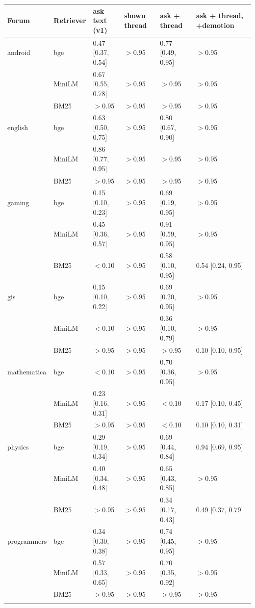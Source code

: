 \begin{tabular}{llllll}\toprule Forum & Retriever & ask text (v1) & shown thread & ask + thread & ask + thread, +demotion\\\midrule
android & bge & 0.47 [0.37, 0.54] & $>$0.95 & 0.77 [0.49, 0.95] & $>$0.95\\
 & MiniLM & 0.67 [0.55, 0.78] & $>$0.95 & $>$0.95 & $>$0.95\\
 & BM25 & $>$0.95 & $>$0.95 & $>$0.95 & $>$0.95\\
\addlinespace[1pt]
english & bge & 0.63 [0.50, 0.75] & $>$0.95 & 0.80 [0.67, 0.90] & $>$0.95\\
 & MiniLM & 0.86 [0.77, 0.95] & $>$0.95 & $>$0.95 & $>$0.95\\
 & BM25 & $>$0.95 & $>$0.95 & $>$0.95 & $>$0.95\\
\addlinespace[1pt]
gaming & bge & 0.15 [0.10, 0.23] & $>$0.95 & 0.69 [0.19, 0.95] & $>$0.95\\
 & MiniLM & 0.45 [0.36, 0.57] & $>$0.95 & 0.91 [0.59, 0.95] & $>$0.95\\
 & BM25 & $<$0.10 & $>$0.95 & 0.58 [0.10, 0.95] & 0.54 [0.24, 0.95]\\
\addlinespace[1pt]
gis & bge & 0.15 [0.10, 0.22] & $>$0.95 & 0.69 [0.20, 0.95] & $>$0.95\\
 & MiniLM & $<$0.10 & $>$0.95 & 0.36 [0.10, 0.79] & $>$0.95\\
 & BM25 & $>$0.95 & $>$0.95 & $>$0.95 & 0.10 [0.10, 0.95]\\
\addlinespace[1pt]
mathematica & bge & $<$0.10 & $>$0.95 & 0.70 [0.36, 0.95] & $>$0.95\\
 & MiniLM & 0.23 [0.16, 0.31] & $>$0.95 & $<$0.10 & 0.17 [0.10, 0.45]\\
 & BM25 & $>$0.95 & $>$0.95 & $<$0.10 & 0.10 [0.10, 0.31]\\
\addlinespace[1pt]
physics & bge & 0.29 [0.19, 0.34] & $>$0.95 & 0.69 [0.44, 0.84] & 0.94 [0.69, 0.95]\\
 & MiniLM & 0.40 [0.34, 0.48] & $>$0.95 & 0.65 [0.43, 0.85] & $>$0.95\\
 & BM25 & $>$0.95 & $>$0.95 & 0.34 [0.17, 0.43] & 0.49 [0.37, 0.79]\\
\addlinespace[1pt]
programmers & bge & 0.34 [0.30, 0.38] & $>$0.95 & 0.74 [0.45, 0.95] & $>$0.95\\
 & MiniLM & 0.57 [0.33, 0.65] & $>$0.95 & 0.70 [0.35, 0.92] & $>$0.95\\
 & BM25 & $>$0.95 & $>$0.95 & $>$0.95 & $>$0.95\\
\addlinespace[1pt]

\end{tabular}
